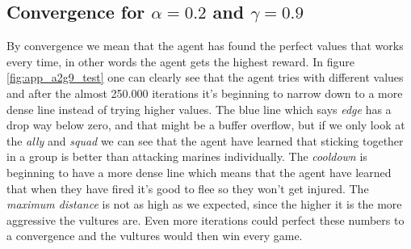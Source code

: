 
\subsection*{Convergence for $\alpha= 0.2$ and $\gamma = 0.9$}

By convergence we mean that the agent has found the perfect values that works every time, in other words the agent gets the highest reward. In figure \ref{fig:app_a2g9_test} one can clearly see that the agent tries with different values and after the almost 250.000 iterations it's beginning to narrow down to a more dense line instead of trying higher values. The blue line which says \textit{edge} has a drop way below zero, and that might be a buffer overflow, but if we only look at the \textit{ally} and \textit{squad} we can see that the agent have learned that sticking together in a group is better than attacking marines individually. The \textit{cooldown} is beginning to have a more dense line which means that the agent have learned that when they have fired it's good to flee so they won't get injured. The \textit{maximum distance} is not as high as we expected, since the higher it is the more aggressive the vultures are. Even more iterations could perfect these numbers to a convergence and the vultures would then win every game. 


